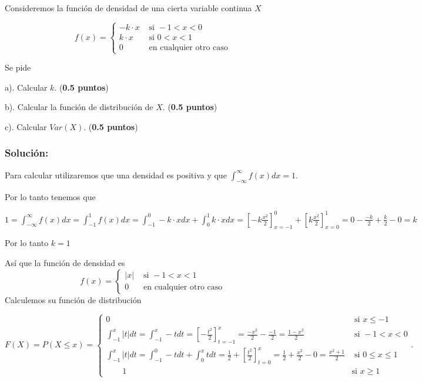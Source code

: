 \documentclass[]{article}
\begin{document}
Consideremos la función de densidad de una cierta variable continua
\(X\)

\[f(x)=\left\{
\begin{array}{cr}
-k\cdot x & \mbox{ si } -1<x<0\\
k\cdot x & \mbox{ si }  0<x<1\\
0 & \mbox{ en cualquier otro caso}
\end{array}
\right.
\]

Se pide

a). Calcular \(k\). (\textbf{0.5 puntos})

b). Calcular la función de distribución de \(X\). (\textbf{0.5 puntos})

c). Calcular \(Var(X)\). (\textbf{0.5 puntos})

\hypertarget{soluciuxf3n-7}{%
\subsubsection{Solución:}\label{soluciuxf3n-7}}

Para calcular utilizaremos que una densidad es positiva y que
\(\int_{-\infty}^{\infty} f(x) dx=1\).

Por lo tanto tenemos que

\(1=\int_{-\infty}^{\infty} f(x) dx=\int_{-1}^{1} f(x) dx= \int_{-1}^{0} -k \cdot x dx+\int_{0}^{1} k \cdot x dx= \left[-k\frac{x^2}{2}\right]_{x=-1}^0+\left[k\frac{x^2}{2}\right]_{x=0}^1= 0- \frac{-k}{2}+ \frac{k}{2}-0=k\)

Por lo tanto \(k=1\)

Así que la función de densidad es \[f(x)=\left\{
\begin{array}{cr}
|x| & \mbox{ si }  -1<x<1\\
0 & \mbox{ en cualquier otro caso}
\end{array}
\right.
\] Calculemos su función de distribución

\[F(X)=P(X\leq x)=\left\{
\begin{array}{lr}
0 & \mbox{ si }  x\leq -1\\
\int_{-1}^x |t| dt=\int_{-1}^x -t dt=\left[-\frac{t^2}{2}\right]_{t=-1}^x= \frac{-x^2}{2}-\frac{-1}{2}=\frac{1-x^2}{2}   & \mbox{ si }  -1< x <0\\
\int_{-1}^x |t| dt=\int_{-1}^{0} -t dt +\int_{0}^x t dt=\frac{1}{2}+\left[\frac{t^2}{2}\right]_{t=0}^x= \frac{1}{2}+\frac{x^2}{2}-0=\frac{x^2+1}{2}   & \mbox{ si }  0\leq x\leq 1\\
\qquad 1 & \mbox{si } x \geq 1
\end{array}
\right.
.\]
\end{document}
